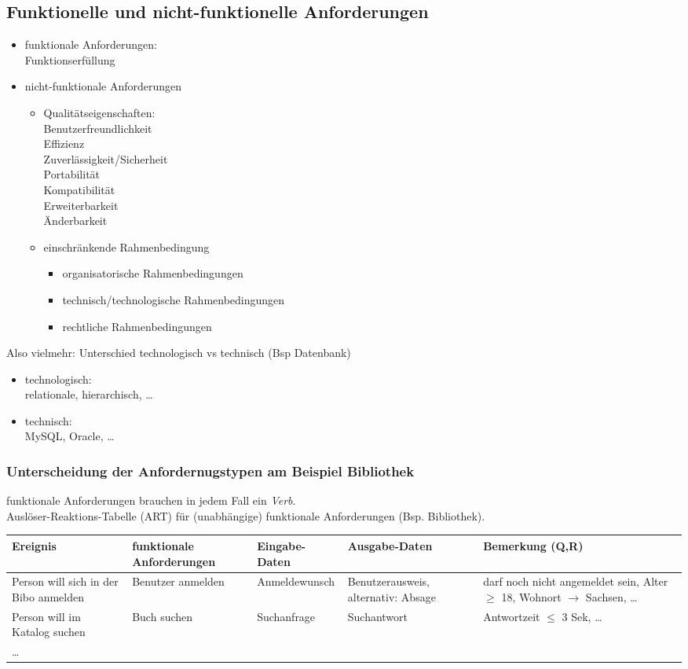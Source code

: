 \documentclass{scrreprt}
\begin{document}
\subsection{Funktionelle und nicht-funktionelle Anforderungen}
\begin{itemize}
\item funktionale Anforderungen:\\
Funktionserfüllung
\item nicht-funktionale Anforderungen
\begin{itemize}
\item Qualitätseigenschaften:\\
Benutzerfreundlichkeit\\
Effizienz\\
Zuverlässigkeit/Sicherheit\\
Portabilität\\
Kompatibilität\\
Erweiterbarkeit\\
Änderbarkeit
\item einschränkende Rahmenbedingung
\begin{itemize}
\item organisatorische Rahmenbedingungen
\item technisch/technologische Rahmenbedingungen
\item rechtliche Rahmenbedingungen
\end{itemize}
\end{itemize}
\end{itemize}
Also vielmehr:
Unterschied technologisch vs technisch (Bsp Datenbank)
\begin{itemize}
\item technologisch:\\
relationale, hierarchisch, …
\item technisch:\\
MySQL, Oracle, …
\end{itemize}
\subsubsection{Unterscheidung der Anfordernugstypen am Beispiel Bibliothek}
funktionale Anforderungen brauchen in jedem Fall ein \emph{Verb}.\\
Auslöser-Reaktions-Tabelle (ART) für (unabhängige) funktionale Anforderungen (Bsp. Bibliothek).
\begin{tabular}{L{.2} | L{.2} | L{.15} | L{.15} | L{.2}}
Ereignis & funktionale Anforderungen & Eingabe-Daten & Ausgabe-Daten &Bemerkung (Q,R)\\
\hline 
Person will sich in der Bibo anmelden & Benutzer anmelden & Anmeldewunsch & Benutzerausweis, alternativ: Absage & darf noch nicht angemeldet sein, Alter $\geq$ 18, Wohnort $\to$ Sachsen, …\\
\hline 
Person will im Katalog suchen & Buch suchen & Suchanfrage & Suchantwort & Antwortzeit $\leq $ 3 Sek, …\\
\hline 
… &&&&
\end{tabular}
\end{document}
